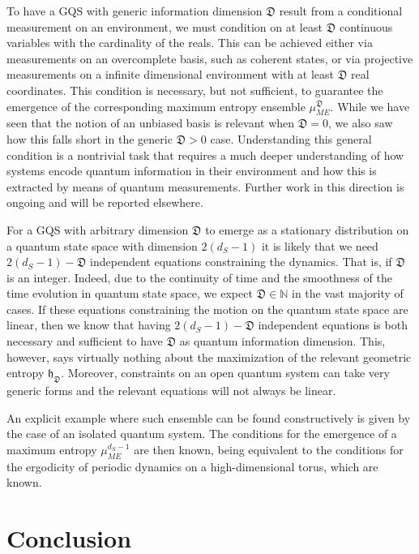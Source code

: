 \documentclass[draft,nofootinbib,pre,twocolumn,showpacs,showkeys,groupaddress,preprintnumbers,floatfix]{revtex4-1}
\newcommand{\1}{\mathbbm{1}}
\newcommand{\ID}{\mathfrak{D}}
\begin{document}
To have a GQS with generic information dimension $\ID$ result from a
conditional measurement on an environment, we must condition on at least $\ID$
continuous variables with the cardinality of the reals. This can be achieved
either via measurements on an overcomplete basis, such as coherent states, or
via projective measurements on a infinite dimensional environment with at least
$\ID$ real coordinates. This condition is necessary, but not sufficient, to
guarantee the emergence of the corresponding maximum entropy ensemble
$\mu_{ME}^{\ID}$. While we have seen that the notion of an unbiased basis is
relevant when $\ID = 0$, we also saw how this falls short in the generic $\ID >
0$ case. Understanding this general condition is a nontrivial task that
requires a much deeper understanding of how systems encode quantum information
in their environment and how this is extracted by means of quantum
measurements. Further work in this direction is ongoing and will be reported
elsewhere.

For a GQS with arbitrary dimension $\ID$ to emerge as a stationary distribution on a quantum state space with dimension
$2(d_S-1)$ it is likely that we need $2(d_S-1) - \ID$ independent equations constraining the dynamics. That is, if $\ID$ is an integer.
Indeed, due to the continuity of time and the smoothness of the time evolution in quantum state space, we expect $\ID \in \mathbb{N}$ 
in the vast majority of cases. If these equations constraining the motion on the quantum state space are linear, then we know that 
having $2(d_S-1) - \ID$ independent equations is both necessary and sufficient to have $\ID$ as quantum information dimension. 
This, however, says virtually nothing about the maximization of the relevant geometric entropy $\mathfrak{h}_{\ID}$. Moreover, constraints 
on an open quantum system can take very generic forms and the relevant equations will not always be linear. 

An explicit example where such ensemble can be found constructively is given by the case of an isolated quantum system. The conditions
for the emergence of a maximum entropy $\mu_{ME}^{d_S-1}$ are then known, being equivalent to the conditions for the ergodicity of
periodic dynamics on a high-dimensional torus, which are known.

\section{Conclusion}\label{sec:Conclusion}
\end{document}
